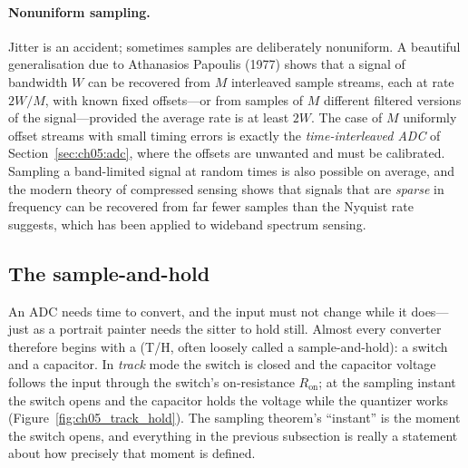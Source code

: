 \paragraph{Nonuniform sampling.} Jitter is an accident; sometimes samples are deliberately
nonuniform. A beautiful generalisation due to Athanasios Papoulis (1977) shows that a signal of
bandwidth $W$ can be recovered from $M$ interleaved sample streams, each at rate $2W/M$, with
known fixed offsets---or from samples of $M$ different filtered versions of the signal---provided
the average rate is at least $2W$. The case of $M$ uniformly offset streams with small timing
errors is exactly the \emph{time-interleaved ADC} of Section~\ref{sec:ch05:adc}, where the
offsets are unwanted and must be calibrated. Sampling a band-limited signal at random times is
also possible on average, and the modern theory of compressed sensing shows that signals that
are \emph{sparse} in frequency can be recovered from far fewer samples than the Nyquist rate
suggests, which has been applied to wideband spectrum sensing.


\subsection{The sample-and-hold}
\label{sec:ch05:sh}

An ADC needs time to convert, and the input must not change while it does---just as a portrait
painter needs the sitter to hold still. Almost every converter therefore begins with a
 (T/H, often loosely called a sample-and-hold): a switch and a capacitor. In
\emph{track} mode the switch is closed and the capacitor voltage follows the input through the
switch's on-resistance $R_{\text{on}}$; at the sampling instant the switch opens and the capacitor
holds the voltage while the quantizer works (Figure~\ref{fig:ch05_track_hold}). The sampling
theorem's ``instant'' is the moment the switch opens, and everything in the previous subsection is
really a statement about how precisely that moment is defined.


